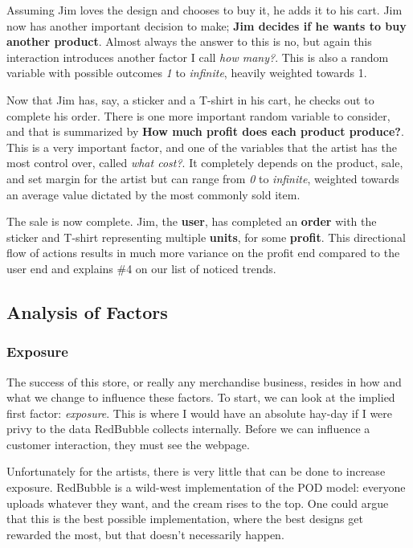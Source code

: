 \documentclass[]{article}
\begin{document}
Assuming Jim loves the design and chooses to buy it, he adds it to his
cart. Jim now has another important decision to make; \textbf{Jim
decides if he wants to buy another product}. Almost always the answer to
this is no, but again this interaction introduces another factor I call
\emph{how many?}. This is also a random variable with possible outcomes
\emph{1} to \emph{infinite}, heavily weighted towards 1.

Now that Jim has, say, a sticker and a T-shirt in his cart, he checks
out to complete his order. There is one more important random variable
to consider, and that is summarized by \textbf{How much profit does each
product produce?}. This is a very important factor, and one of the
variables that the artist has the most control over, called \emph{what
cost?}. It completely depends on the product, sale, and set margin for
the artist but can range from \emph{0} to \emph{infinite}, weighted
towards an average value dictated by the most commonly sold item.

The sale is now complete. Jim, the \textbf{user}, has completed an
\textbf{order} with the sticker and T-shirt representing multiple
\textbf{units}, for some \textbf{profit}. This directional flow of
actions results in much more variance on the profit end compared to the
user end and explains \#4 on our list of noticed trends.

\subsection{Analysis of Factors}\label{analysis-of-factors}

\subsubsection{Exposure}\label{exposure}

The success of this store, or really any merchandise business, resides
in how and what we change to influence these factors. To start, we can
look at the implied first factor: \emph{exposure}. This is where I would
have an absolute hay-day if I were privy to the data RedBubble collects
internally. Before we can influence a customer interaction, they must
see the webpage.

Unfortunately for the artists, there is very little that can be done to
increase exposure. RedBubble is a wild-west implementation of the POD
model: everyone uploads whatever they want, and the cream rises to the
top. One could argue that this is the best possible implementation,
where the best designs get rewarded the most, but that doesn't
necessarily happen.
\end{document}
